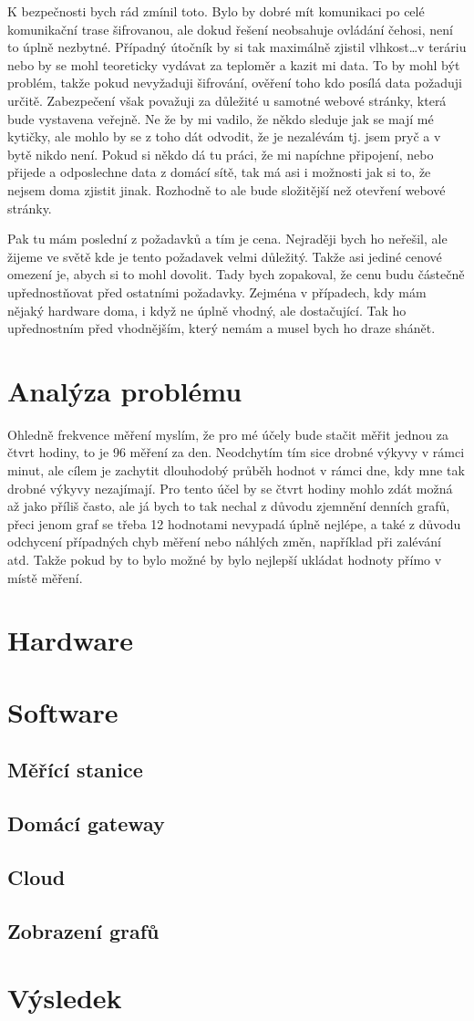 K bezpečnosti bych rád zmínil toto. Bylo by dobré mít komunikaci po celé komunikační trase šifrovanou, ale dokud řešení 
neobsahuje ovládání čehosi, není to úplně nezbytné. Případný útočník by si tak maximálně zjistil vlhkost\ldots v teráriu
nebo by se mohl teoreticky vydávat za teploměr a kazit mi data. To by mohl být problém, takže pokud nevyžaduji 
šifrování, ověření toho kdo posílá data požaduji určitě. Zabezpečení však považuji za důležité u samotné webové stránky, 
která bude vystavena veřejně. Ne že by mi vadilo, že někdo sleduje jak se mají mé kytičky, ale mohlo by se z toho dát 
odvodit, že je nezalévám tj. jsem pryč a v bytě nikdo není. Pokud si někdo dá tu práci, že mi napíchne připojení, nebo 
přijede a odposlechne data z domácí sítě, tak má asi i možnosti jak si to, že nejsem doma zjistit jinak. Rozhodně to ale 
bude složitější než otevření webové stránky.

Pak tu mám poslední z požadavků a tím je cena. Nejraději bych ho neřešil, ale žijeme ve světě kde je tento požadavek 
velmi důležitý. Takže asi jediné cenové omezení je, abych si to mohl dovolit. Tady bych zopakoval, že cenu budu částečně 
upřednostňovat před ostatními požadavky. Zejména v případech, kdy mám nějaký hardware doma, i když ne úplně vhodný, ale 
dostačující. Tak ho upřednostním před vhodnějším, který nemám a musel bych ho draze shánět.
\chapter{Analýza problému}
Ohledně frekvence měření myslím, že pro mé účely bude stačit měřit jednou za čtvrt hodiny, to je 96 měření za den. 
Neodchytím tím sice drobné výkyvy v rámci minut, ale cílem je zachytit dlouhodobý průběh hodnot v rámci dne, kdy mne tak 
drobné výkyvy nezajímají. Pro tento účel by se čtvrt hodiny mohlo zdát možná až jako příliš často, ale já bych to tak 
nechal z důvodu zjemnění denních grafů, přeci jenom graf se třeba 12 hodnotami nevypadá úplně nejlépe, a také z důvodu 
odchycení případných chyb měření nebo náhlých změn, například při zalévání atd.
Takže pokud by to bylo možné by bylo nejlepší ukládat hodnoty přímo v místě měření.
\chapter{Hardware}
\chapter{Software}
\section{Měřící stanice}
\section{Domácí gateway}
\section{Cloud}
\section{Zobrazení grafů}
\chapter{Výsledek}
